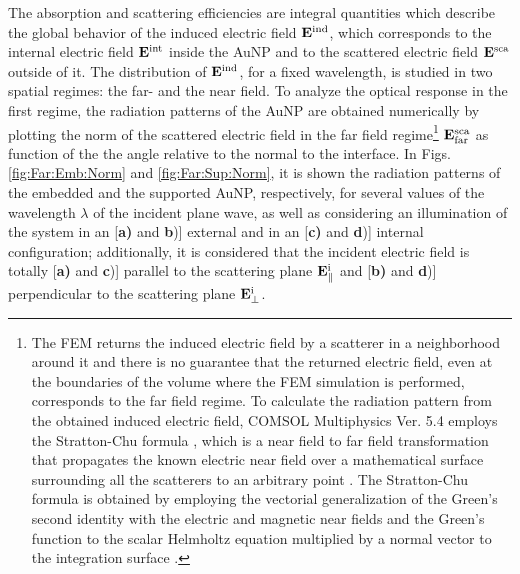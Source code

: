 The absorption and scattering efficiencies are integral quantities which describe the global behavior of the induced electric field $\vb{E}^\text{ind}$, which corresponds to the internal electric field $\vb{E}^\text{int}$ inside the AuNP and to the scattered electric field $\vb{E}^\text{sca}$ outside of it. The distribution of $\vb{E}^\text{ind}$, for a fixed wavelength, is studied in two spatial regimes: the far- and the near field. To analyze the optical response in the first regime, the radiation patterns of the AuNP are obtained numerically by plotting the norm of the scattered electric field in the far field regime\footnote{\label{fnote:Stratton:Chu}%
    The FEM returns the induced electric field by a scatterer in a neighborhood around it  and there is no guarantee that the returned electric field, even at the boundaries of the volume where the FEM simulation is performed, corresponds to the far field regime.  To calculate the radiation pattern from the obtained induced electric field, COMSOL Multiphysics\texttrademark{} Ver. 5.4  employs the  Stratton-Chu formula \cite{comsol_wave}, which is a near field to far field  transformation that  propagates the known electric near field  over a mathematical surface surrounding all the scatterers  to an arbitrary point \cite{anyutin_algorithm_2019}. The Stratton-Chu formula is obtained by employing the vectorial generalization of the Green's second identity with the electric and magnetic near fields and the Green's function to the scalar Helmholtz equation multiplied by a normal vector to the integration surface \cite{stratton_diffraction_1939}.%
    } %
 $\vb{E}^\text{sca}_\text{far}$ as function of the the angle relative to the normal to the interface. In Figs. \ref{fig:Far:Emb:Norm} and  \ref{fig:Far:Sup:Norm}, it is shown the radiation patterns of the embedded and the supported AuNP, respectively, for several values of the wavelength $\lambda$ of the incident plane wave, as well as considering an illumination of the system in an  [\textbf{a)} and \textbf{b})] external and in an  [\textbf{c)} and \textbf{d})] internal configuration; additionally, it is considered that the incident electric field is totally [\textbf{a)} and \textbf{c})] parallel to the scattering plane $\vb{E}^\text{i}_\parallel$ and [\textbf{b)} and \textbf{d})] perpendicular to the scattering plane $\vb{E}^\text{i}_\perp$.

